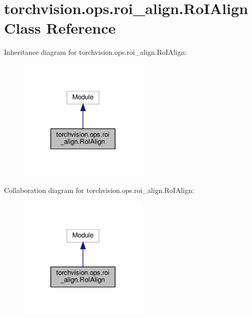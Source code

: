 \hypertarget{classtorchvision_1_1ops_1_1roi__align_1_1RoIAlign}{}\section{torchvision.\+ops.\+roi\+\_\+align.\+Ro\+I\+Align Class Reference}
\label{classtorchvision_1_1ops_1_1roi__align_1_1RoIAlign}


Inheritance diagram for torchvision.\+ops.\+roi\+\_\+align.\+Ro\+I\+Align\+:
\nopagebreak
\begin{figure}[H]
\begin{center}
\leavevmode
\includegraphics[width=176pt]{classtorchvision_1_1ops_1_1roi__align_1_1RoIAlign__inherit__graph}
\end{center}
\end{figure}


Collaboration diagram for torchvision.\+ops.\+roi\+\_\+align.\+Ro\+I\+Align\+:
\nopagebreak
\begin{figure}[H]
\begin{center}
\leavevmode
\includegraphics[width=176pt]{classtorchvision_1_1ops_1_1roi__align_1_1RoIAlign__coll__graph}
\end{center}
\end{figure}
